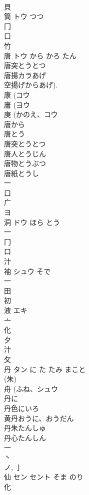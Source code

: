 \documentclass[8pt]{extreport}
\begin{document}
\begin{CJK}{UTF8}{min}
\\	貝 
\\	筒	トウ	つつ	
\\	冂 
\\	口 
\\	竹 
\\	唐	トウ	から かろ たん	
\\	唐突とうとつ 
\\	唐揚カラあげ 
\\	空揚げからあげ). 
\\	康 (コウ 
\\	庸 (ヨウ 
\\	庚 (かのえ、コウ 
\\	唐から
\\	唐とう
\\	唐突とうとつ
\\	唐人とうじん
\\	唐物とうぶつ
\\	唐紙とうし
\\	一 
\\	口 
\\	广 
\\	ヨ	
\\	洞	ドウ	ほら とう	
\\	一 
\\	冂 
\\	口 
\\	汁 
\\	袖	シュウ	そで	
\\	一 
\\	田 
\\	初 
\\	液	エキ		
\\	亠 
\\	化 
\\	夕 
\\	汁 
\\	攵 
\\	丹	タン	に た たみ まこと	
\\	(朱) 
\\	舟 (ふね、シュウ 
\\	丹に
\\	丹色にいろ
\\	黄丹おうに、おうだん
\\	丹朱たんしゅ
\\	丹心たんしん
\\	一 
\\	丶 
\\	ノ, 亅 
\\	仙	セン セント	そま のり	
\\	化 

\end{CJK}
\end{document}
